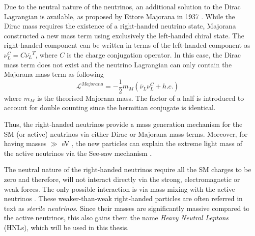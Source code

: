 Due to the neutral nature of the neutrinos, an additional solution to the Dirac Lagrangian is available, as proposed by Ettore Majorana in 1937 \cite{}.
While the Dirac mass requires the existence of a right-handed neutrino state, Majorana constructed a new mass term using exclusively the left-handed chiral state.
The right-handed component can be written in terms of the left-handed component as $\nu^{C}_{L}=C\overline{\nu_{L}}^{T}$, where $C$ is the charge conjugation operator.
In this case, the Dirac mass term does not exist and the neutrino Lagrangian can only contain the Majorana mass term as following
\begin{equation}
	\mathcal{L}^{Majorana} = -\frac{1}{2}m_{M}(\overline{\nu}_{L}\nu_{L}^{C} + h.c.)
\end{equation}
where $m_{M}$ is the theorised Majorana mass. 
The factor of a half is introduced to account for double counting since the hermitian conjugate is identical.

Thus, the right-handed neutrinos provide a mass generation mechanism for the SM (or active) neutrinos via either Dirac or Majorana mass terms.
Moreover, for having masses $\gg$ eV , the new particles can explain the extreme light mass of the active neutrinos via the See-saw mechanism \cite{}.

The neutral nature of the right-handed neutrinos require all the SM charges to be zero and therefore, will not interact directly via the strong, electromagnetic or weak forces.
The only possible interaction is via mass mixing with the active neutrinos \cite{}.
These weaker-than-weak right-handed particles are often referred in text as \textit{sterile neutrinos}.
Since their masses are significantly massive compared to the active neutrinos, this also gains them the name \textit{Heavy Neutral Leptons} (HNLs), which will be used in this thesis.

